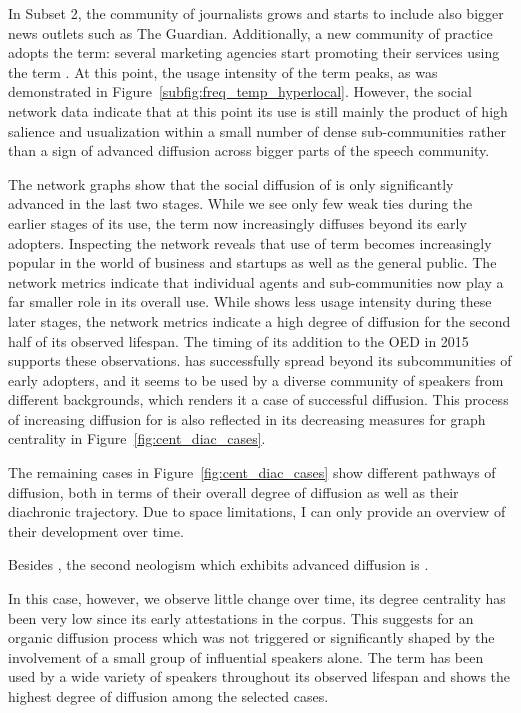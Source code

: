 \documentclass[
  a4paper,
  abstract=on,
  captions=tableabove
  ]{scrartcl}
\begin{document}
      In Subset 2, the community of journalists grows and starts to include also bigger news outlets such as The Guardian. Additionally, a new community of practice adopts the term: several marketing agencies start promoting their services using the term . At this point, the usage intensity of the term peaks, as was demonstrated in Figure~\ref{subfig:freq_temp_hyperlocal}. However, the social network data indicate that at this point its use is still mainly the product of high salience and usualization within a small number of dense sub-communities rather than a sign of advanced diffusion across bigger parts of the speech community.

      The network graphs show that the social diffusion of  is only significantly advanced in the last two stages. While we see only few weak ties during the earlier stages of its use, the term now increasingly diffuses beyond its early adopters. Inspecting the network reveals that use of term becomes increasingly popular in the world of business and startups as well as the general public. The network metrics indicate that individual agents and sub-communities now play a far smaller role in its overall use. While  shows less usage intensity during these later stages, the network metrics indicate a high degree of diffusion for the second half of its observed lifespan. The timing of its addition to the OED in 2015 supports these observations.  has successfully spread beyond its subcommunities of early adopters, and it seems to be used by a diverse community of speakers from different backgrounds, which renders it a case of successful diffusion. This process of increasing diffusion for  is also reflected in its decreasing measures for graph centrality in Figure~\ref{fig:cent_diac_cases}.

      The remaining cases in Figure~\ref{fig:cent_diac_cases} show different pathways of diffusion, both in terms of their overall degree of diffusion as well as their diachronic trajectory. Due to space limitations, I can only provide an overview of their development over time.
      
      Besides , the second neologism which exhibits advanced diffusion is .
      
      In this case, however, we observe little change over time, its degree centrality has been very low since its early attestations in the corpus. This suggests for an organic diffusion process which was not triggered or significantly shaped by the involvement of a small group of influential speakers alone. The term  has been used by a wide variety of speakers throughout its observed lifespan and shows the highest degree of diffusion among the selected cases.
\end{document}
